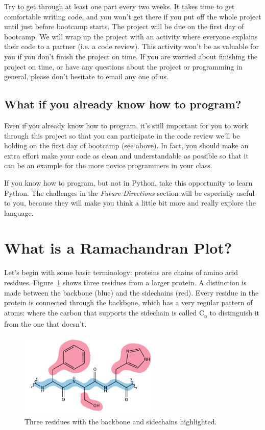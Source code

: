 \documentclass{article}
\newcommand{\calpha}{C\textsubscript{\textgreek{a}}}
\begin{document}
Try to get through at least one part every two weeks.  It takes time to get 
comfortable writing code, and you won't get there if you put off the whole 
project until just before bootcamp starts.  The project will be due on the 
first day of bootcamp.  We will wrap up the project with an activity where 
everyone explains their code to a partner (i.e. a code review).  This activity 
won't be as valuable for you if you don't finish the project on time.  If you 
are worried about finishing the project on time, or have any questions about 
the project or programming in general, please don't hesitate to email any one 
of us.

\subsection{What if you already know how to program?}

Even if you already know how to program, it's still important for you to work 
through this project so that you can participate in the code review we'll be 
holding on the first day of bootcamp (see above).  In fact, you should make an 
extra effort make your code as clean and understandable as possible so that it 
can be an example for the more novice programmers in your class.

If you know how to program, but not in Python, take this opportunity to learn 
Python.  The challenges in the \emph{Future Directions} section will be 
especially useful to you, because they will make you think a little bit more 
and really explore the language.

\section{What is a Ramachandran Plot?}

Let's begin with some basic terminology: proteins are chains of amino acid 
residues.  Figure~\ref{fig:three-residues} shows three residues from a larger 
protein.  A distinction is made between the backbone (blue) and the sidechains 
(red).  Every residue in the protein is connected through the backbone, which 
has a very regular pattern of atoms:  where the carbon that supports the sidechain is 
called \calpha{} to distinguish it from the one that doesn't.

\begin{figure}[h]
 \centering
 \includegraphics[width=0.60\textwidth]{three-residues}
 \caption{Three residues with the backbone and sidechains highlighted.}
 \label{fig:three-residues}
\end{figure}
\end{document}
